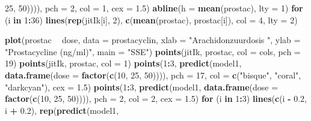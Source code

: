 \documentclass[12pt,dutch,coursenotes]{book}
\newenvironment{Shaded}{\begin{snugshade}}{\end{snugshade}}
\newcommand{\KeywordTok}[1]{\textcolor[rgb]{0.13,0.29,0.53}{\textbf{#1}}}
\newcommand{\DataTypeTok}[1]{\textcolor[rgb]{0.13,0.29,0.53}{#1}}
\newcommand{\DecValTok}[1]{\textcolor[rgb]{0.00,0.00,0.81}{#1}}
\newcommand{\FloatTok}[1]{\textcolor[rgb]{0.00,0.00,0.81}{#1}}
\newcommand{\StringTok}[1]{\textcolor[rgb]{0.31,0.60,0.02}{#1}}
\newcommand{\ControlFlowTok}[1]{\textcolor[rgb]{0.13,0.29,0.53}{\textbf{#1}}}
\newcommand{\OperatorTok}[1]{\textcolor[rgb]{0.81,0.36,0.00}{\textbf{#1}}}
\newcommand{\NormalTok}[1]{#1}
\theoremstyle{definition}
\theoremstyle{definition}
\theoremstyle{definition}
\theoremstyle{remark}
\begin{document}
\begin{Shaded}
\begin{Highlighting}[]
    \DecValTok{25}\NormalTok{, }\DecValTok{50}\NormalTok{)))), }\DataTypeTok{pch =} \DecValTok{2}\NormalTok{, }\DataTypeTok{col =} \DecValTok{1}\NormalTok{, }\DataTypeTok{cex =} \FloatTok{1.5}\NormalTok{)}
\KeywordTok{abline}\NormalTok{(}\DataTypeTok{h =} \KeywordTok{mean}\NormalTok{(prostac), }\DataTypeTok{lty =} \DecValTok{1}\NormalTok{)}
\ControlFlowTok{for}\NormalTok{ (i }\ControlFlowTok{in} \DecValTok{1}\OperatorTok{:}\DecValTok{36}\NormalTok{) }\KeywordTok{lines}\NormalTok{(}\KeywordTok{rep}\NormalTok{(jitIk[i], }\DecValTok{2}\NormalTok{), }\KeywordTok{c}\NormalTok{(}\KeywordTok{mean}\NormalTok{(prostac), }
\NormalTok{    prostac[i]), }\DataTypeTok{col =} \DecValTok{4}\NormalTok{, }\DataTypeTok{lty =} \DecValTok{2}\NormalTok{)}

\KeywordTok{plot}\NormalTok{(prostac }\OperatorTok{~}\StringTok{ }\NormalTok{dose, }\DataTypeTok{data =}\NormalTok{ prostacyclin, }\DataTypeTok{xlab =} \StringTok{"Arachidonzuurdosis "}\NormalTok{, }
    \DataTypeTok{ylab =} \StringTok{"Prostacycline (ng/ml)"}\NormalTok{, }\DataTypeTok{main =} \StringTok{"SSE"}\NormalTok{)}
\KeywordTok{points}\NormalTok{(jitIk, prostac, }\DataTypeTok{col =}\NormalTok{ cols, }\DataTypeTok{pch =} \DecValTok{19}\NormalTok{)}
\KeywordTok{points}\NormalTok{(jitIk, prostac, }\DataTypeTok{col =} \DecValTok{1}\NormalTok{)}
\KeywordTok{points}\NormalTok{(}\DecValTok{1}\OperatorTok{:}\DecValTok{3}\NormalTok{, }\KeywordTok{predict}\NormalTok{(model1, }\KeywordTok{data.frame}\NormalTok{(}\DataTypeTok{dose =} \KeywordTok{factor}\NormalTok{(}\KeywordTok{c}\NormalTok{(}\DecValTok{10}\NormalTok{, }
    \DecValTok{25}\NormalTok{, }\DecValTok{50}\NormalTok{)))), }\DataTypeTok{pch =} \DecValTok{17}\NormalTok{, }\DataTypeTok{col =} \KeywordTok{c}\NormalTok{(}\StringTok{"bisque"}\NormalTok{, }\StringTok{"coral"}\NormalTok{, }
    \StringTok{"darkcyan"}\NormalTok{), }\DataTypeTok{cex =} \FloatTok{1.5}\NormalTok{)}
\KeywordTok{points}\NormalTok{(}\DecValTok{1}\OperatorTok{:}\DecValTok{3}\NormalTok{, }\KeywordTok{predict}\NormalTok{(model1, }\KeywordTok{data.frame}\NormalTok{(}\DataTypeTok{dose =} \KeywordTok{factor}\NormalTok{(}\KeywordTok{c}\NormalTok{(}\DecValTok{10}\NormalTok{, }
    \DecValTok{25}\NormalTok{, }\DecValTok{50}\NormalTok{)))), }\DataTypeTok{pch =} \DecValTok{2}\NormalTok{, }\DataTypeTok{col =} \DecValTok{2}\NormalTok{, }\DataTypeTok{cex =} \FloatTok{1.5}\NormalTok{)}
\ControlFlowTok{for}\NormalTok{ (i }\ControlFlowTok{in} \DecValTok{1}\OperatorTok{:}\DecValTok{3}\NormalTok{) }\KeywordTok{lines}\NormalTok{(}\KeywordTok{c}\NormalTok{(i }\OperatorTok{-}\StringTok{ }\FloatTok{0.2}\NormalTok{, i }\OperatorTok{+}\StringTok{ }\FloatTok{0.2}\NormalTok{), }\KeywordTok{rep}\NormalTok{(}\KeywordTok{predict}\NormalTok{(model1, }

\end{Highlighting}
\end{Shaded}
\end{document}
